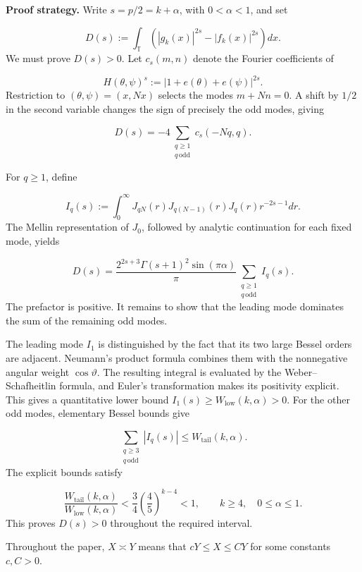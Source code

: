 \documentclass[11pt]{article}
\theoremstyle{plain}
\theoremstyle{definition}
\theoremstyle{remark}
\begin{document}
\textbf{Proof strategy.} Write $s = p/2 = k + \alpha$, with $0 < \alpha < 1$, and set

\[
  D(s) := \int_{\mathbb{T}} \left( |g_k(x)|^{2s} - |f_k(x)|^{2s} \right) dx .
\]
We must prove $D(s) > 0$. Let $c_s(m,n)$ denote the Fourier coefficients of

\[
  H(\theta ,\psi )^s := |1 + e(\theta ) + e(\psi )|^{2s} .
\]
Restriction to $(\theta ,\psi ) = (x, Nx)$ selects the modes $m + Nn = 0$. A shift by $1/2$ in the second variable changes the sign of precisely the odd modes, giving

\[
  D(s) = -4 \sum_{\substack{q \ge 1 \\ q \,\mathrm{odd}}} c_s(-Nq, q) .
\]

For $q \ge 1$, define

\[
  I_q(s) := \int_{0}^{\infty } J_{qN}(r) J_{q(N-1)}(r) J_q(r) r^{-2s-1} dr .
\]
The Mellin representation of $J_{0}$, followed by analytic continuation for each fixed mode, yields

\begin{equation}\label{eq:strategy}
  D(s) = \frac{2^{2s+3}\Gamma (s+1)^{2} \sin (\pi \alpha )}{\pi } \sum_{\substack{q \ge 1 \\ q \,\mathrm{odd}}} I_q(s) .
\end{equation}
The prefactor is positive. It remains to show that the leading mode dominates the sum of the remaining odd modes.

The leading mode $I_{1}$ is distinguished by the fact that its two large Bessel orders are adjacent. Neumann's product formula combines them with the nonnegative angular weight $\cos \vartheta$. The resulting integral is evaluated by the Weber--Schafheitlin formula, and Euler's transformation makes its positivity explicit. This gives a quantitative lower bound $I_{1}(s) \ge W_{\mathrm{low}}(k,\alpha ) > 0$. For the other odd modes, elementary Bessel bounds give

\[
  \sum_{\substack{q \ge 3 \\ q \,\mathrm{odd}}} |I_q(s)| \le W_{\mathrm{tail}}(k,\alpha ) .
\]
The explicit bounds satisfy

\[
  \frac{W_{\mathrm{tail}}(k,\alpha )}{W_{\mathrm{low}}(k,\alpha )} < \frac{3}{4} \left( \frac{4}{5} \right)^{k-4} < 1 , \qquad  k \ge 4, \quad  0 \le \alpha \le 1 .
\]
This proves $D(s) > 0$ throughout the required interval.

Throughout the paper, $X \asymp Y$ means that $cY \le X \le CY$ for some constants $c, C > 0$.
\end{document}

